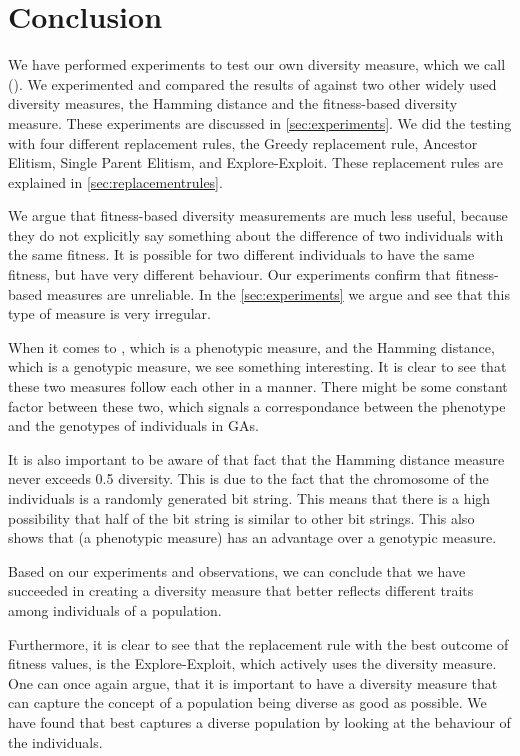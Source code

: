 \section{Conclusion}\label{sec:conclusion}

We have performed experiments to test our own diversity measure, which we call \di{} (\dia{}). We experimented and compared the results of \dia{} against two other widely used diversity measures, the Hamming distance and the fitness-based diversity measure. These experiments are discussed in \cref{sec:experiments}. We did the testing with four different replacement rules, the Greedy replacement rule, Ancestor Elitism, Single Parent Elitism, and Explore-Exploit. These replacement rules are explained in \cref{sec:replacementrules}.

We argue that fitness-based diversity measurements are much less useful, because they do not explicitly say something about the difference of two individuals with the same fitness. It is possible for two different individuals to have the same fitness, but have very different behaviour. Our experiments confirm that fitness-based measures are unreliable. In the \cref{sec:experiments} we argue and see that this type of measure is very irregular.

When it comes to \dia{}, which is a phenotypic measure, and the Hamming distance, which is a genotypic measure, we see something interesting. It is clear to see that these two measures follow each other in a manner. There might be some constant factor between these two, which signals a correspondance between the phenotype and the genotypes of individuals in GAs.

It is also important to be aware of that fact that the Hamming distance measure never exceeds \num{0.5} diversity. This is due to the fact that the chromosome of the individuals is a randomly generated bit string. This means that there is a high possibility that half of the bit string is similar to other bit strings. This also shows that \dia{} (a phenotypic measure) has an advantage over a genotypic measure. 

Based on our experiments and observations, we can conclude that we have succeeded in creating a diversity measure that better reflects different traits among individuals of a population.

Furthermore, it is clear to see that the replacement rule with the best outcome of fitness values, is the Explore-Exploit, which actively uses the diversity measure. One can once again argue, that it is important to have a diversity measure that can capture the concept of a population being diverse as good as possible. We have found that \dia{} best captures a diverse population by looking at the behaviour of the individuals.
